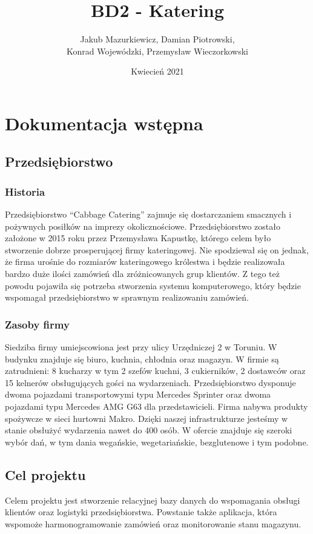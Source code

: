 \documentclass[10pt,a4paper]{article}
\title{BD2 - Katering}
\author{Jakub Mazurkiewicz, Damian Piotrowski,\\Konrad Wojewódzki, Przemysław Wieczorkowski}
\date{Kwiecień 2021}
\newcommand{\quotes}[1]{``#1''}
\begin{document}
\maketitle

\section{Dokumentacja wstępna}

\subsection{Przedsiębiorstwo}

\subsubsection{Historia}
Przedsiębiorstwo \quotes{Cabbage Catering} zajmuje się dostarczaniem smacznych i pożywnych posiłków na imprezy okolicznościowe. Przedsiębiorstwo zostało założone w 2015 roku przez Przemysława Kapustkę, którego celem było stworzenie dobrze prosperującej firmy kateringowej. Nie spodziewał się on jednak, że firma urośnie do rozmiarów kateringowego królestwa i będzie realizowała bardzo duże ilości zamówień dla zróżnicowanych grup klientów. Z tego też powodu pojawiła się potrzeba stworzenia systemu komputerowego, który będzie wspomagał przedsiębiorstwo w sprawnym realizowaniu zamówień.

\subsubsection{Zasoby firmy}
Siedziba firmy umiejscowiona jest przy ulicy Urzędniczej 2 w Toruniu. W budynku znajduje się biuro, kuchnia, chłodnia oraz magazyn. W firmie są zatrudnieni: 8 kucharzy w tym 2 szefów kuchni, 3 cukierników, 2 dostawców oraz 15 kelnerów obsługujących gości na wydarzeniach. Przedsiębiorstwo dysponuje dwoma pojazdami transportowymi typu Mercedes Sprinter oraz dwoma pojazdami typu Mercedes AMG G63 dla przedstawicieli. Firma nabywa produkty spożywcze w sieci hurtowni Makro. Dzięki naszej infrastrukturze jesteśmy w stanie obsłużyć wydarzenia nawet do 400 osób. W ofercie znajduje się szeroki wybór dań, w tym dania wegańskie, wegetariańskie, bezglutenowe i tym podobne. 

\subsection{Cel projektu}
Celem projektu jest stworzenie relacyjnej bazy danych do wspomagania obsługi klientów oraz logistyki przedsiębiorstwa. Powstanie także aplikacja, która wspomoże harmonogramowanie zamówień oraz monitorowanie stanu magazynu.
\end{document}
